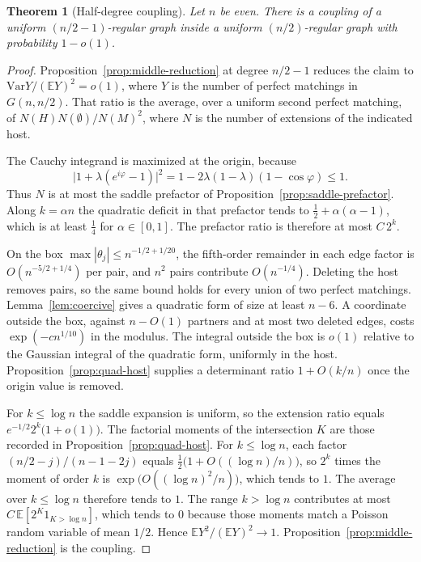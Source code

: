 \documentclass[11pt]{article}
\newtheorem{theorem}{Theorem}
\newcommand{\EE}{\mathbb{E}}
\newcommand{\Var}{\mathrm{Var}}
\begin{document}
\begin{theorem}[Half-degree coupling]
\label{thm:half}
Let \(n\) be even. There is a coupling of a uniform \((n/2-1)\)-regular graph inside a uniform \((n/2)\)-regular graph with probability \(1-o(1)\).
\end{theorem}

\begin{proof}
Proposition~\ref{prop:middle-reduction} at degree \(n/2-1\) reduces the claim to \(\Var Y/(\EE Y)^2=o(1)\), where \(Y\) is the number of perfect matchings in \(G(n,n/2)\).
That ratio is the average, over a uniform second perfect matching, of \(N(H)N(\emptyset)/N(M)^2\), where \(N\) is the number of extensions of the indicated host.

The Cauchy integrand is maximized at the origin, because
\[
\bigl|1+\lambda(e^{i\varphi}-1)\bigr|^2=1-2\lambda(1-\lambda)(1-\cos\varphi)\le 1.
\]
Thus \(N\) is at most the saddle prefactor of Proposition~\ref{prop:saddle-prefactor}.
Along \(k=\alpha n\) the quadratic deficit in that prefactor tends to \(\tfrac12+\alpha(\alpha-1)\), which is at least \(\tfrac14\) for \(\alpha\in[0,1]\).
The prefactor ratio is therefore at most \(C\,2^{k}\).

On the box \(\max|\theta_j|\le n^{-1/2+1/20}\), the fifth-order remainder in each edge factor is \(O(n^{-5/2+1/4})\) per pair, and \(n^2\) pairs contribute \(O(n^{-1/4})\).
Deleting the host removes pairs, so the same bound holds for every union of two perfect matchings.
Lemma~\ref{lem:coercive} gives a quadratic form of size at least \(n-6\). A coordinate outside the box, against \(n-O(1)\) partners and at most two deleted edges, costs \(\exp(-c n^{1/10})\) in the modulus.
The integral outside the box is \(o(1)\) relative to the Gaussian integral of the quadratic form, uniformly in the host.
Proposition~\ref{prop:quad-host} supplies a determinant ratio \(1+O(k/n)\) once the origin value is removed.

For \(k\le\log n\) the saddle expansion is uniform, so the extension ratio equals \(e^{-1/2}2^{k}\bigl(1+o(1)\bigr)\).
The factorial moments of the intersection \(K\) are those recorded in Proposition~\ref{prop:quad-host}.
For \(k\le\log n\), each factor \((n/2-j)/(n-1-2j)\) equals \(\tfrac12\bigl(1+O((\log n)/n)\bigr)\), so \(2^{k}\) times the moment of order \(k\) is \(\exp\bigl(O((\log n)^2/n)\bigr)\), which tends to \(1\).
The average over \(k\le\log n\) therefore tends to \(1\).
The range \(k>\log n\) contributes at most \(C\,\EE[2^{K}1_{K>\log n}]\), which tends to \(0\) because those moments match a Poisson random variable of mean \(1/2\).
Hence \(\EE Y^2/(\EE Y)^2\to 1\).
Proposition~\ref{prop:middle-reduction} is the coupling.
\end{proof}
\end{document}
